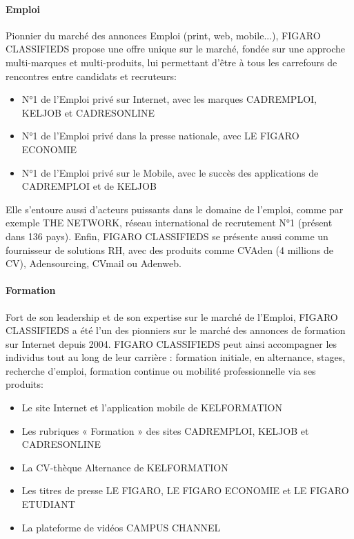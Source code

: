 \paragraph{Emploi}
Pionnier du marché des annonces Emploi (print, web, mobile...), FIGARO CLASSIFIEDS propose une offre unique sur le marché, fondée sur une approche multi-marques et multi-produits, lui permettant d'être à tous les carrefours de rencontres entre candidats et recruteurs:
\begin{itemize}
  \item N°1 de l'Emploi privé sur Internet, avec les marques CADREMPLOI, KELJOB et CADRESONLINE
  \item N°1 de l'Emploi privé dans la presse nationale, avec LE FIGARO ECONOMIE
  \item N°1 de l'Emploi privé sur le Mobile, avec le succès des applications de CADREMPLOI et de KELJOB
\end{itemize}
Elle s'entoure aussi d'acteurs puissants dans le domaine de l'emploi, comme par exemple THE NETWORK, réseau international de recrutement N°1 (présent dans 136 pays).
Enfin, FIGARO CLASSIFIEDS se présente aussi comme un fournisseur de solutions RH, avec des produits comme CVAden (4 millions de CV), Adensourcing, CVmail ou Adenweb.

\paragraph{Formation}
Fort de son leadership et de son expertise sur le marché de l'Emploi, FIGARO CLASSIFIEDS a été l'un des pionniers sur le marché des annonces de formation sur Internet depuis 2004.
FIGARO CLASSIFIEDS peut ainsi accompagner les individus tout au long de leur carrière : formation initiale, en alternance, stages, recherche d'emploi, formation continue ou mobilité professionnelle via ses produits:
\begin{itemize}
  \item Le site Internet et l'application mobile de KELFORMATION
  \item Les rubriques « Formation » des sites CADREMPLOI, KELJOB et CADRESONLINE
  \item La CV-thèque Alternance de KELFORMATION
  \item Les titres de presse LE FIGARO, LE FIGARO ECONOMIE et LE FIGARO ETUDIANT
  \item La plateforme de vidéos CAMPUS CHANNEL
\end{itemize}

